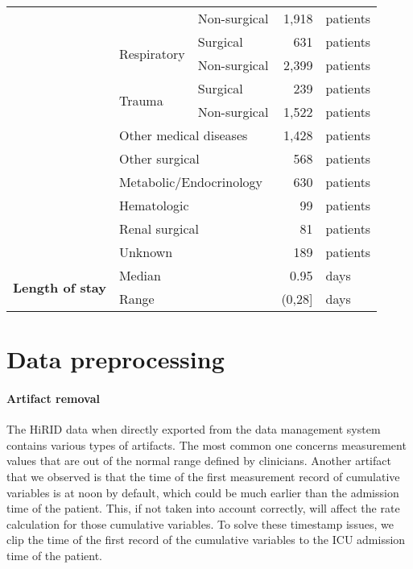 \documentclass{article}
\begin{document}
\begin{table}[!ht]
{\begin{tabular}{l l l r l}
         & & Non-surgical & 1,918 & patients \\ \cmidrule{2-5}
         & \multirow{2}{*}{Respiratory} & Surgical & 631 & patients \\ \cmidrule{3-5}
         & & Non-surgical & 2,399 & patients \\ \cmidrule{2-5}
         & \multirow{2}{*}{Trauma} & Surgical & 239 & patients \\ \cmidrule{3-5}
         & & Non-surgical & 1,522 & patients \\ \cmidrule{2-5}
         & \multicolumn{2}{l}{Other medical diseases} & 1,428 & patients \\ \cmidrule{2-5}
         & \multicolumn{2}{l}{Other surgical} & 568 & patients \\ \cmidrule{2-5}
         & \multicolumn{2}{l}{Metabolic/Endocrinology} & 630 & patients \\ \cmidrule{2-5}
         & \multicolumn{2}{l}{Hematologic} & 99 & patients \\ \cmidrule{2-5}
         & \multicolumn{2}{l}{Renal surgical} & 81 & patients \\ \cmidrule{2-5}
         & \multicolumn{2}{l}{Unknown} & 189 & patients \\ \midrule
\multirow{2}{*}{\textbf{Length of stay }} & \multicolumn{2}{l}{Median} & 0.95 & days \\ \cmidrule{2-5}
         & \multicolumn{2}{l}{Range} & (0,28] & days \\ \midrule
    \end{tabular}
    }
\end{table}


\section*{Data preprocessing}\label{appsec:data_preprocessing}



\paragraph{Artifact removal} The HiRID data when directly exported from the data management system contains various types of artifacts. The most common one concerns measurement values that are out of the normal range defined by clinicians. Another artifact that we observed is that the time of the first measurement record of cumulative variables is at noon by default, which could be much earlier than the admission time of the patient. This, if not taken into account correctly, will affect the rate calculation for those cumulative variables.
To solve these timestamp issues, we clip the time of the first record of 
the cumulative variables to the ICU admission time of the patient.
\end{document}
